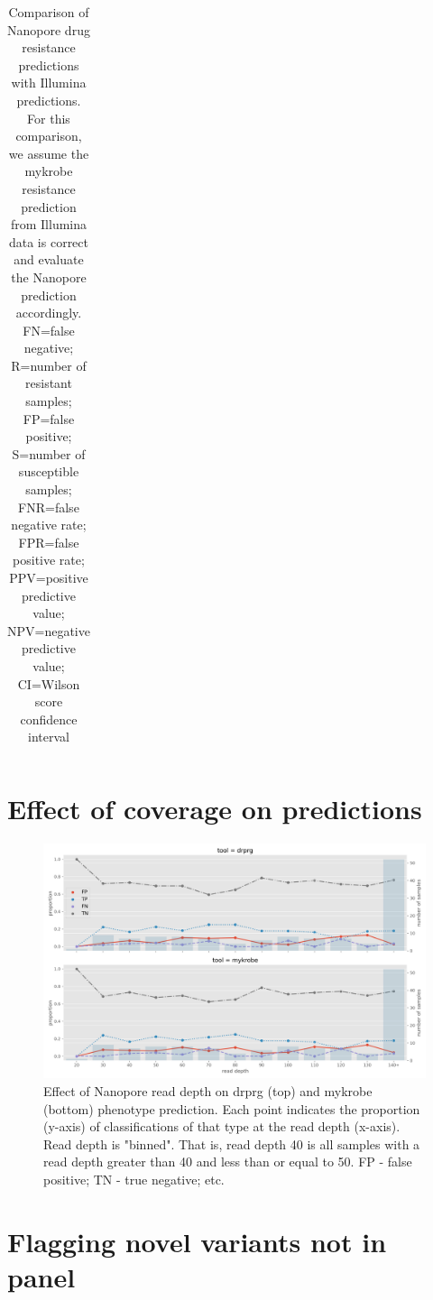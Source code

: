 \begin{table}
{\begin{tabular}{|l|l|l|c|c|c|c|c|c|}
\end{tabular}%
}
\caption{Comparison of Nanopore drug resistance predictions with Illumina predictions.
For this comparison, we assume the mykrobe resistance prediction from Illumina data is correct and evaluate the Nanopore prediction accordingly.
FN=false negative; R=number of resistant samples; FP=false positive; S=number of susceptible samples; FNR=false negative rate; FPR=false positive rate; PPV=positive predictive value; NPV=negative predictive value; CI=Wilson score confidence interval}
\label{tab:geno-concordance}
\end{table}

\section{Effect of coverage on predictions}
\begin{figure}
\begin{center}
\includegraphics[width=0.90\columnwidth]{Chapter3/Figs/phenotype_coverage.png}
\caption{{Effect of Nanopore read depth on drprg (top) and mykrobe (bottom) phenotype prediction. Each point indicates the proportion (y-axis) of classifications of that type at the read depth (x-axis). Read depth is "binned". That is, read depth 40 is all samples with a read depth greater than 40 and less than or equal to 50. FP - false positive; TN - true negative; etc.
{\label{fig:pheno-covg}}
}}
\end{center}
\end{figure}
\section{Flagging novel variants not in panel}

